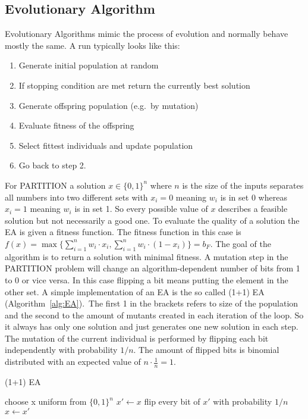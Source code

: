 \subsection{Evolutionary Algorithm}
Evolutionary Algorithms mimic the process of evolution and normally behave mostly the same.
A run typically looks like this:
\begin{enumerate}
      \item Generate initial population at random
      \item If stopping condition are met return the currently best solution
      \item Generate offspring population (e.g.\ by mutation)
      \item Evaluate fitness of the offspring
      \item Select fittest individuals and update population
      \item Go back to step 2.
\end{enumerate}
For PARTITION a solution $x\in{\{0,1\}}^{n}$ where $n$ is the size of the inputs separates all numbers into two different sets with $x_i=0$ meaning $w_i$ is in set 0 whereas $x_i=1$ meaning $w_i$ is in set 1.
So every possible value of $x$ describes a feasible solution but not necessarily a good one.
To evaluate the quality of a solution the EA is given a fitness function.
The fitness function in this case is \(f(x)=\max\{\sum_{i=1}^{n}w_i\cdot x_i, \sum_{i=1}^{n}w_i\cdot(1-x_i)\}=b_F\).
The goal of the algorithm is to return a solution with minimal fitness.
A mutation step in the PARTITION problem will change an algorithm-dependent number of bits from 1 to 0 or vice versa.
In this case flipping a bit means putting the element in the other set.
A simple implementation of an EA is the so called (1+1) EA (Algorithm~\ref{alg:EA}).\
The first 1 in the brackets refers to size of the population and the second to the amount of mutants created in each iteration of the loop.
So it always has only one solution and just generates one new solution in each step.
The mutation of the current individual is performed by flipping each bit independently with probability $1/n$.
The amount of flipped bits is binomial distributed with an expected value of $n\cdot\frac{1}{n}=1$.
\begin{algorithm}[bt]
      \caption{\textsc{(1+1) EA}}\label{alg:EA}

      \DontPrintSemicolon %

      \BlankLine
      choose x uniform from ${\{0,1\}}^n$\;
      {
      $x' \leftarrow x$\;
      flip every bit of $x'$ with probability $1/n$\;
      {
      {
            $x \leftarrow x'$\;
      }
      }
      }
\end{algorithm}
